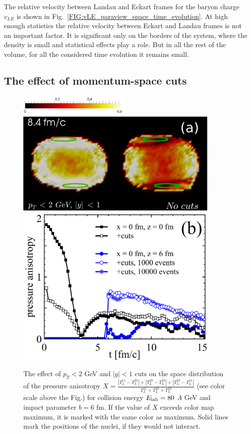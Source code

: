 The relative velocity between Landau and Eckart frames for the baryon charge
$v_{LE}$ is shown in Fig.~\ref{FIG:vLE_paraview_space_time_evolution}. At high
enough statistics the relative velocity between Eckart and Landau frames is not
an important factor. It is significant only on the borders of the system, where
the density is small and statistical effects play a role. But in all the rest of
the volume, for all the considered time evolution it remains small.

\subsection{The effect of momentum-space cuts}
\begin{figure}
  \includegraphics[height = 1cm]{plots/thermalization_urqmd/E80b6_x_paraview_color_legend_for_cuts.png} \\
  \includegraphics[width = 10cm]{plots/thermalization_urqmd/E80b6_x_paraview_cuts_comparison_t_8_4fm.png}
  \includegraphics[width = 10cm]{plots/thermalization_urqmd/E80b6_x_vs_t_few_space_points_with_cuts.pdf}
   \caption{The effect of $p_T < 2$ GeV and $|y| < 1$ cuts on the space
            distribution of the pressure anisotropy $X =
            \frac{|T_L^{11}-T_L^{22}|+|T_L^{22}-T_L^{33}|+|T_L^{33}-T_L^{11}|}
            {T_L^{11}+T_L^{22}+T_L^{33}}$
            (see color scale above the Fig.) for collision energy 
            $E_\mathrm{lab} = 80$ \emph{A} GeV and impact parameter $b = 6$ fm.
            If the value of $X$ exceeds color map maximum, it is marked with the same
            color as maximum. Solid lines mark the positions of the nuclei, if they
            would not interact.}
\label{FIG:X_paraview_cuts_effect}
\end{figure}

